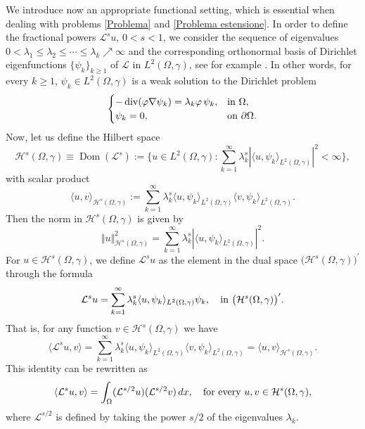 \documentclass[a4paper,10pt,reqno]{amsart}
\numberwithin{equation}{section}
\begin{document}
We introduce now an appropriate functional setting, which is essential when dealing with problems \eqref{Problema} and
\eqref{Problema estensione}. In order to define the fractional powers
$\mathcal{L}^su$, $0<s<1$, we consider the sequence of eigenvalues
$0<\lambda_1\leq \lambda_2\leq\cdots\leq\lambda_k\nearrow\infty$
and the corresponding
orthonormal basis of Dirichlet eigenfunctions $\{\psi_{k}\}_{k\geq1}$ of
$\mathcal{L}$ in $L^{2}(\Omega,\gamma)$, see for example \cite{Betta-Chiacchio-Ferone}.
In other words, for every $k\geq1$, $\psi_{k}\in L^2(\Omega,\gamma)$
is a weak solution to the Dirichlet problem
$$\begin{cases}
-\operatorname{div}(\varphi\nabla\psi_{k})=\lambda_{k}\varphi\,\psi_{k},&\hbox{in}~\Omega,\\
\psi_{k}=0,&\hbox{on}~\partial\Omega.
\end{cases}$$
Now, let us define the Hilbert space
\[
\mathcal{H}^s(\Omega,\gamma)\equiv\operatorname{Dom}(\mathcal{L}^{s}
):=\Big\{u\in L^{2}(\Omega,\gamma):\sum_{k=1}^{\infty}\lambda_{k}
^s|\langle u,\psi_{k}\rangle_{L^{2}(\Omega,\gamma)}|^{2}<\infty\Big\},
\]
with scalar product
\[
\langle u,v\rangle_{\mathcal{H}^s(\Omega,\gamma)}:=\sum_{k=1}^{\infty}
\lambda_{k}^{s}\langle u,\psi_{k}\rangle_{L^{2}(\Omega,\gamma)}\langle
v,\psi_{k}\rangle_{L^{2}(\Omega,\gamma)}.
\]
Then the norm in $\mathcal{H}^s(\Omega,\gamma)$ is given by
\[
\Vert u\Vert_{\mathcal{H}^s(\Omega,\gamma)}^{2}=\sum_{k=1}^{\infty}\lambda
_{k}^{s}|\langle u,\psi_{k}\rangle_{L^{2}(\Omega,\gamma)}|^{2}.
\]
For $u\in\mathcal{H}^s(\Omega,\gamma)$, we define $\mathcal{L}^{s}u$ as the
element in the dual space $\big(\mathcal{H}^s(\Omega,\gamma)\big)^{\prime}$ through the formula
\[
\mathcal{L}^{s}u=\sum_{k=1}^{\infty}\lambda_{k}^{s}\langle u,\psi
_{k}\rangle_{L^{2}(\Omega,\gamma)}\psi_{k},\quad\hbox{in}~\big(\mathcal{H}^s(\Omega,\gamma)\big)^{\prime}.
\]
That is, for any function $v\in\mathcal{H}^s(\Omega,\gamma)$ we have
\[
\langle\mathcal{L}^su,v\rangle=\sum_{k=1}^{\infty}\lambda_{k}^{s}\langle
u,\psi_{k}\rangle_{L^{2}(\Omega,\gamma)}\langle v,\psi_{k}\rangle
_{L^{2}(\Omega,\gamma)}=\langle u,v\rangle_{\mathcal{H}^s(\Omega,\gamma)}.
\]
This identity can be rewritten as
\[
\langle\mathcal{L}^{s}u,v\rangle=\int_{\Omega}(\mathcal{L}^{s/2}
u)(\mathcal{L}^{s/2}v)\,dx,\quad\hbox{for every}~u,v\in\mathcal{H}^s(\Omega,\gamma),
\]
where $\mathcal{L}^{s/2}$ is defined by taking the power $s/2$ of the
eigenvalues $\lambda_{k}$.
\end{document}
